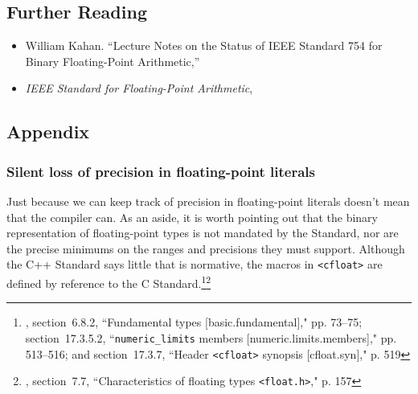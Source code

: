 \subsection[Further Reading]{Further Reading}\label{further-reading}

\begin{itemize}
\item{William Kahan. ``Lecture Notes on the Status of
IEEE Standard 754 for Binary Floating-Point Arithmetic,'' \cite{kahan97}}
\item{{\textit{IEEE Standard for Floating-Point Arithmetic}}, \cite{ieee19}}
\end{itemize}

\subsection[Appendix]{Appendix}\label{appendix-digitsep}

\subsubsection[Silent loss of precision in floating-point literals]{Silent loss of precision in floating-point literals}\label{appendix:-silent-loss-of-precision-in-floating-point-literals}

Just because we can keep track of precision in floating-point literals
doesn't mean that the compiler can. As an aside, it is worth
pointing out that the binary representation of floating-point types is
not mandated by the Standard, nor are the precise minimums on the ranges
and precisions they must support. Although the C++ Standard says little
that is normative, the macros in \lstinline!<cfloat>! are defined by
reference to the C Standard.\footnote{\cite{iso20b}, section~6.8.2, ``Fundamental types [basic.fundamental]," pp. 73--75; section~17.3.5.2, ``\texttt{numeric\_limits} members [numeric.limits.members]," pp. 513--516; and section~17.3.7, ``Header \texttt{<cfloat>} synopsis [cfloat.syn]," p. 519}\footnote{\cite{iso18b}, section~7.7,
``Characteristics of floating types \texttt{<float.h>}," p. 157}

